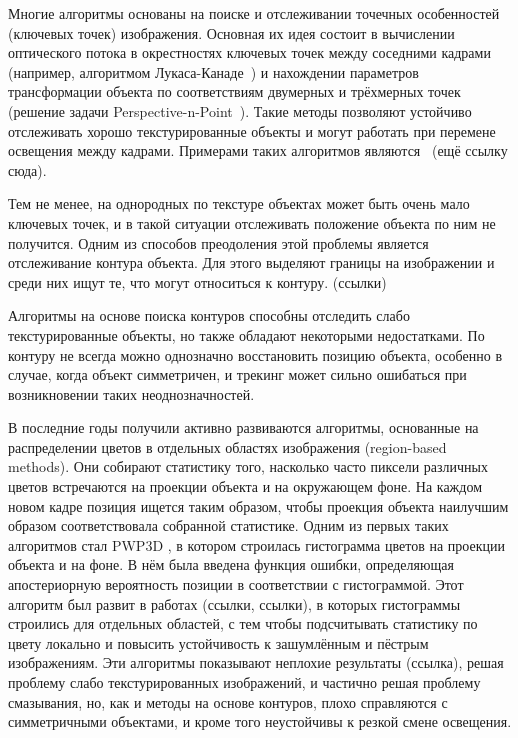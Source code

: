 Многие алгоритмы основаны на поиске и отслеживании точечных особенностей
(ключевых точек) изображения.
Основная их идея состоит в вычислении оптического потока в окрестностях
ключевых точек между соседними кадрами (например, алгоритмом
Лукаса-Канаде~\cite{LukasKanade}) и нахождении параметров трансформации объекта
по соответствиям двумерных и трёхмерных точек (решение задачи
Perspective-n-Point~\cite{PnPRansac}).
Такие методы позволяют устойчиво отслеживать хорошо текстурированные объекты и
могут работать при перемене освещения между кадрами.
Примерами таких алгоритмов являются~\cite{LourakisFeatures} (ещё ссылку сюда). 

Тем не менее, на однородных по текстуре объектах может быть очень мало ключевых
точек, и в такой ситуации отслеживать положение объекта по ним не получится.
Одним из способов преодоления этой проблемы является отслеживание контура
объекта.
Для этого выделяют границы на изображении и среди них ищут те, что могут
относиться к контуру. (ссылки)


Алгоритмы на основе поиска контуров способны отследить слабо текстурированные
объекты, но также обладают некоторыми недостатками.
По контуру не всегда можно однозначно восстановить позицию объекта, особенно в
случае, когда объект симметричен, и трекинг может сильно ошибаться при
возникновении таких неоднозначностей.

В последние годы получили активно развиваются алгоритмы, основанные на
распределении цветов в отдельных областях изображения (region-based methods).
Они собирают статистику того, насколько часто пиксели различных цветов
встречаются на проекции объекта и на окружающем фоне.
На каждом новом кадре позиция ищется таким образом, чтобы проекция объекта
наилучшим образом соответствовала собранной статистике.
Одним из первых таких алгоритмов стал PWP3D \cite{PWP3D}, в котором строилась
гистограмма цветов на проекции объекта и на фоне.
В нём была введена функция ошибки, определяющая апостериорную вероятность
позиции в соответствии с гистограммой.
Этот алгоритм был развит в работах (ссылки, ссылки), в которых гистограммы
строились для отдельных областей, с тем чтобы подсчитывать статистику по цвету
локально и повысить устойчивость к зашумлённым и пёстрым изображениям.
Эти алгоритмы показывают неплохие результаты (ссылка), решая проблему слабо
текстурированных изображений, и частично решая проблему смазывания, но, как и
методы на основе контуров, плохо справляются с симметричными объектами, и кроме
того неустойчивы к резкой смене освещения.


